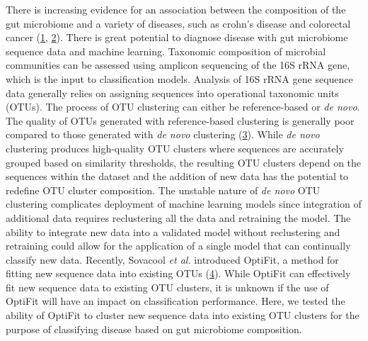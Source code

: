 \documentclass[
]{article}
\begin{document}
\newpage

There is increasing evidence for an association between the composition
of the gut microbiome and a variety of diseases, such as crohn's disease
and colorectal cancer (\protect\hyperlink{ref-Morgan2012}{1},
\protect\hyperlink{ref-Sobhani2011}{2}). There is great potential to
diagnose disease with gut microbiome sequence data and machine learning.
Taxonomic composition of microbial communities can be assessed using
amplicon sequencing of the 16S rRNA gene, which is the input to
classification models. Analysis of 16S rRNA gene sequence data generally
relies on assigning sequences into operational taxonomic units (OTUs).
The process of OTU clustering can either be reference-based or \emph{de
novo}. The quality of OTUs generated with reference-based clustering is
generally poor compared to those generated with \emph{de novo}
clustering (\protect\hyperlink{ref-westcott2015}{3}). While \emph{de
novo} clustering produces high-quality OTU clusters where sequences are
accurately grouped based on similarity thresholds, the resulting OTU
clusters depend on the sequences within the dataset and the addition of
new data has the potential to redefine OTU cluster composition. The
unstable nature of \emph{de novo} OTU clustering complicates deployment
of machine learning models since integration of additional data requires
reclustering all the data and retraining the model. The ability to
integrate new data into a validated model without reclustering and
retraining could allow for the application of a single model that can
continually classify new data. Recently, Sovacool \emph{et al.}
introduced OptiFit, a method for fitting new sequence data into existing
OTUs (\protect\hyperlink{ref-sovacool2022}{4}). While OptiFit can
effectively fit new sequence data to existing OTU clusters, it is
unknown if the use of OptiFit will have an impact on classification
performance. Here, we tested the ability of OptiFit to cluster new
sequence data into existing OTU clusters for the purpose of classifying
disease based on gut microbiome composition.
\end{document}
